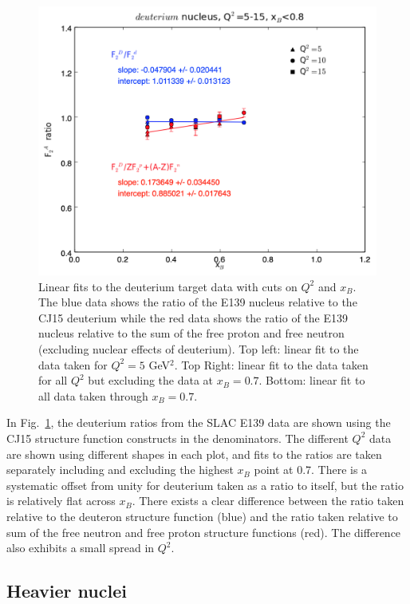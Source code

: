 \documentclass[oneside]{article}
\begin{document}
\begin{figure}
\begin{minipage}{0.5\textwidth}
\includegraphics[width=\textwidth]{plots/q2_all_x_all/all_D.png}
\end{minipage}
  \caption[]{Linear fits to the deuterium target data with cuts on $Q^2$ and $x_B$. The blue data shows the ratio of the E139 nucleus relative to the CJ15 deuterium while the red data shows the ratio of the E139 nucleus relative to the sum of the free proton and free neutron (excluding nuclear effects of deuterium). Top left: linear fit to the data taken for $Q^2=5$ GeV$^2$. Top Right: linear fit to the data taken for all $Q^2$ but excluding the data at $x_B=0.7$. Bottom: linear fit to all data taken through $x_B=0.7$.}
  \label{fig:fits_D}
\end{figure}  

In Fig.~\ref{fig:fits_D}, the deuterium ratios from the SLAC E139 data are shown using the CJ15 structure function constructs in the denominators. The different $Q^2$ data are shown using different shapes in each plot, and fits to the ratios are taken separately including and excluding the highest $x_B$ point at 0.7. There is a systematic offset from unity for deuterium taken as a ratio to itself, but the ratio is relatively flat across $x_B$. There exists a clear difference between the ratio taken relative to the deuteron structure function (blue) and the ratio taken relative to sum of the free neutron and free proton structure functions (red). The difference also exhibits a small spread in $Q^2$.  

\subsection{Heavier nuclei}
\end{document}
